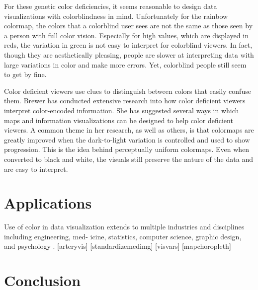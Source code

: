 \documentclass[journal]{IEEEtran}
\begin{document}
For these genetic color deficiencies, it seems reasonable to design data
visualizations with colorblindness in mind. Unfortunately for the rainbow colormap,
the colors that a colorblind user sees are not the same as those seen by a person
with full color vision. Especially for high values, which are displayed in reds,
the variation in green is not easy to interpret for colorblind viewers. In fact,
though they are aesthetically pleasing, people are slower at interpreting data with
large variations in color and make more errors. Yet, colorblind people still seem
to get by fine.

Color deficient viewers use clues to distinguish between colors that easily confuse them.
Brewer has conducted extensive research into how color deficient
viewers interpret color-encoded information. She has suggested several ways in which 
maps and information visualizations can be designed to help color deficient viewers.
A common theme in her research, as well as others, is that colormaps are greatly
improved when the dark-to-light variation is controlled and used to show progression.
This is the idea behind perceptually uniform colormaps. Even when converted to black
and white, the visuals still preserve the nature of the data and are easy to interpret.



%

\section{Applications}
Use of color in data visualization extends to multiple
industries and disciplines including engineering, med-
icine, statistics, computer science, graphic design, and
psychology \cite{colorguidelines}.
[arteryvis]
[standardizemedimg]
[visvars]
[mapchoropleth]

\section{Conclusion}
\blindtext[1]

\ifCLASSOPTIONcaptionsoff
  \newpage
\fi




%



\end{document}
